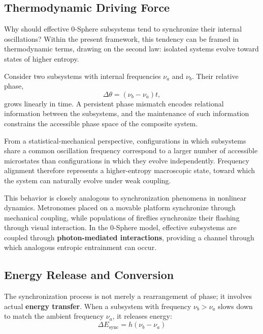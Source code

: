 \documentclass[12pt,letterpaper]{article}
\begin{document}
\subsection{Thermodynamic Driving Force}
\label{subsec:thermodynamic_force}

Why should effective 0-Sphere subsystems tend to synchronize their internal oscillations? Within the present framework, this tendency can be framed in thermodynamic terms, drawing on the second law: isolated systems evolve toward states of higher entropy.

Consider two subsystems with internal frequencies $\nu_a$ and $\nu_b$. Their relative phase,
\[
\Delta\theta = (\nu_b - \nu_a)t,
\]
grows linearly in time. A persistent phase mismatch encodes relational information between the subsystems, and the maintenance of such information constrains the accessible phase space of the composite system.

From a statistical-mechanical perspective, configurations in which subsystems share a common oscillation frequency correspond to a larger number of accessible microstates than configurations in which they evolve independently. Frequency alignment therefore represents a higher-entropy macroscopic state, toward which the system can naturally evolve under weak coupling.

This behavior is closely analogous to synchronization phenomena in nonlinear dynamics. Metronomes placed on a movable platform synchronize through mechanical coupling, while populations of fireflies synchronize their flashing through visual interaction. In the 0-Sphere model, effective subsystems are coupled through \textbf{photon-mediated interactions}, providing a channel through which analogous entropic entrainment can occur.


\subsection{Energy Release and Conversion}
\label{subsec:energy_release}

The synchronization process is not merely a rearrangement of phase; it involves actual \textbf{energy transfer}. When a subsystem with frequency $\nu_b > \nu_a$ slows down to match the ambient frequency $\nu_a$, it releases energy:
\begin{equation}
\Delta E_\text{sync} = h (\nu_b - \nu_a)
\end{equation}
\end{document}
